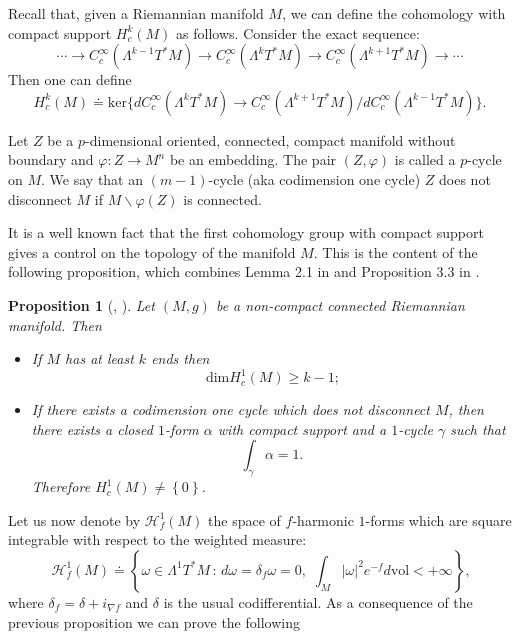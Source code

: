 \documentclass[11pt, leqno]{amsart}
\newtheorem{proposition}[theorem]{Proposition}
\begin{document}
Recall that, given a Riemannian manifold $M$, we can define the cohomology with compact support  $H_c^k(M)$ as follows. Consider the exact sequence:
\[
\cdots \longrightarrow C^{\infty}_c(\Lambda^{k-1}T^*M)\longrightarrow C^{\infty}_c(\Lambda^{k}T^*M)\longrightarrow C^{\infty}_c(\Lambda^{k+1}T^*M)\longrightarrow\cdots
\] 
Then one can define
\[
H^k_c(M)\doteq\mathrm{ker}\{d C^{\infty}_c(\Lambda^{k}T^*M)\rightarrow C^{\infty}_c(\Lambda^{k+1}T^*M)/dC^{\infty}_c(\Lambda^{k-1}T^*M)\}.
\]

Let $Z$ be a $p$-dimensional oriented, connected, compact manifold without boundary and $\varphi:Z\rightarrow M^n$ be an embedding. The pair $(Z,\varphi)$ is called a $p$-cycle on $M$. We say that an $(m-1)$-cycle (aka codimension one cycle) $Z$ does not disconnect $M$ if $M\backslash \varphi(Z)$ is connected. 
\medskip

It is a well known fact that the first cohomology group with compact support gives a control on the topology of the manifold $M$. This is the content of the following proposition, which combines Lemma 2.1 in \cite{Carron_LectNotes} and Proposition 3.3 in \cite{KS}.
\begin{proposition}[\cite{Carron_LectNotes}, \cite{KS}]\label{propH1candtopology}
Let $(M, g)$ be a non-compact connected Riemannian manifold. Then
\begin{itemize}
\item[(i)] If $M$ has at least $k$ ends then
\[
\ \mathrm{dim}H_{c}^{1}(M)\geq k-1;
\]
\item[(ii)] If there exists a codimension one cycle which does not disconnect $M$, then there exists a closed $1$-form $\alpha$ with compact support and a $1$-cycle $\gamma$ such that
\[
 \int_{\gamma}\alpha=1. 
\]
Therefore $H_{c}^{1}(M)\neq \left\{0\right\}$.
\end{itemize}
\end{proposition}

Let us now denote by $\mathcal{H}^{1}_{f}(M)$ the space of $f$-harmonic $1$-forms which are square integrable with respect to the weighted measure:
\[
\ \mathcal{H}^{1}_{f}(M)\doteq\left\{\omega\in\Lambda^{1}T^{*}M\,:\,d\omega=\delta_{f}\omega=0,\,\,\int_{M}|\omega|^{2}e^{-f}d\mathrm{vol}<+\infty\right\},
\]
where $\delta_{f}=\delta+i_{\nabla f}$ and $\delta$ is the usual codifferential. As a consequence of the previous proposition we can prove the following
\end{document}
